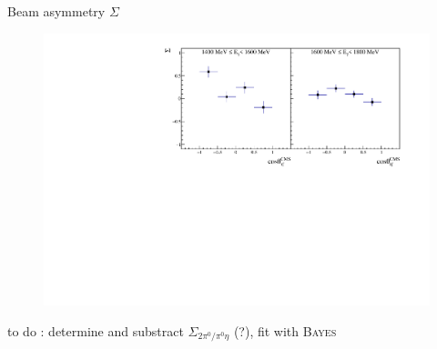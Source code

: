 \documentclass[11pt,aspectratio=169,dvipsnames]{beamer}
\begin{document}
\begin{frame}{Beam asymmetry $\Sigma$}
	\begin{figure}
		\includegraphics[width=.8\linewidth]{../../figs/hydrogen/asymmetry/sigma_alt.pdf}
	\end{figure}
to do : determine and substract $\Sigma_{2\pi^0/\pi^0\eta}$ (?), fit with \textsc{Bayes}
\end{frame}
\end{document}

